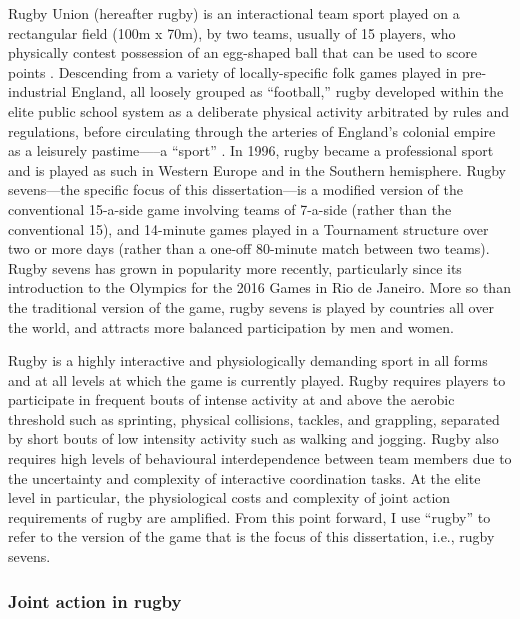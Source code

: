 Rugby Union (hereafter rugby) is an interactional team sport played on a rectangular field (100m x 70m), by two teams, usually of 15 players, who physically contest possession of an egg-shaped ball that can be used to score points \citep{IRB2014}.  Descending from a variety of locally-specific folk games played in pre-industrial England, all loosely grouped as ``football,'' rugby developed within the elite public school system as a deliberate physical activity arbitrated by rules and regulations, before circulating through the arteries of England's colonial empire as a leisurely pastime—--a ``sport'' \citep{Dunning2005}.  In 1996, rugby became a professional sport and is played as such in Western Europe and in the Southern hemisphere. Rugby sevens---the specific focus of this dissertation---is a modified version of the conventional 15-a-side game involving teams of 7-a-side (rather than the conventional 15), and 14-minute games played in a Tournament structure over two or more days (rather than a one-off 80-minute match between two teams).  Rugby sevens has grown in popularity more recently, particularly since its introduction to the Olympics for the 2016 Games in Rio de Janeiro.  More so than the traditional version of the game, rugby sevens is played by countries all over the world, and attracts more balanced participation by men and women.

Rugby is a highly interactive and physiologically demanding sport in all forms and at all levels at which the game is currently played. Rugby requires players to participate in frequent bouts of intense activity at and above the aerobic threshold such as sprinting, physical collisions, tackles, and grappling, separated by short bouts of low intensity activity such as walking and jogging.  Rugby also requires high levels of behavioural interdependence between team members due to the uncertainty and complexity of interactive coordination tasks.  At the elite level in particular, the physiological costs and complexity of joint action requirements of rugby are amplified. From this point forward, I use ``rugby'' to refer to the version of the game that is the focus of this dissertation, i.e., rugby sevens.


\subsubsection{Joint action in rugby}

